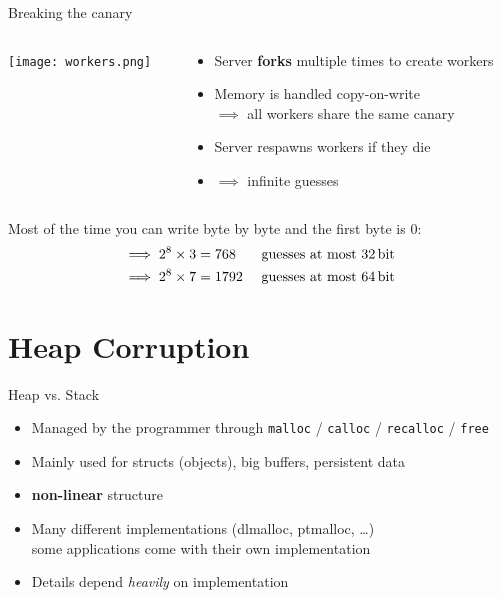 \documentclass[beamer]{uibk}
\begin{document}
\begin{frame}{Breaking the canary}
    \begin{columns}
        \begin{column}{0.4\textwidth}
            \begin{center}
                \texttt{[image: workers.png]}
            \end{center}
        \end{column}
        \pause
        \begin{column}{0.6\textwidth}
            \begin{itemize}
                \item Server \textbf{forks} multiple times to create workers
                \item Memory is handled copy-on-write\\
                    $\implies$ all workers share the same canary
                \item Server respawns workers if they die
                \item $\implies$ infinite guesses
            \end{itemize}
        \end{column}
    \end{columns}
    \bigskip
    \pause
    Most of the time you can write byte by byte and the first byte is $0$:
    \begin{align*}
        \implies 2^8 \times 3 & = 768  & \text{ guesses at most \SI{32}{\bit}}\\
        \implies 2^8 \times 7 & = 1792 & \text{ guesses at most \SI{64}{\bit}}
    \end{align*}
\end{frame}

\section{Heap Corruption}

\begin{frame}{Heap vs. Stack}
    \begin{itemize}
        \item Managed by the programmer through \texttt{malloc} /
            \texttt{calloc} / \texttt{recalloc} / \texttt{free}
        \medskip
        \item Mainly used for structs (objects), big buffers, persistent data
        \medskip
        \item \textbf{non-linear} structure
        \medskip
        \item Many different implementations (dlmalloc, ptmalloc, \dots)\\
            some applications come with their own implementation
        \medskip
        \item Details depend \emph{heavily} on implementation
    \end{itemize}
\end{frame}
\end{document}
